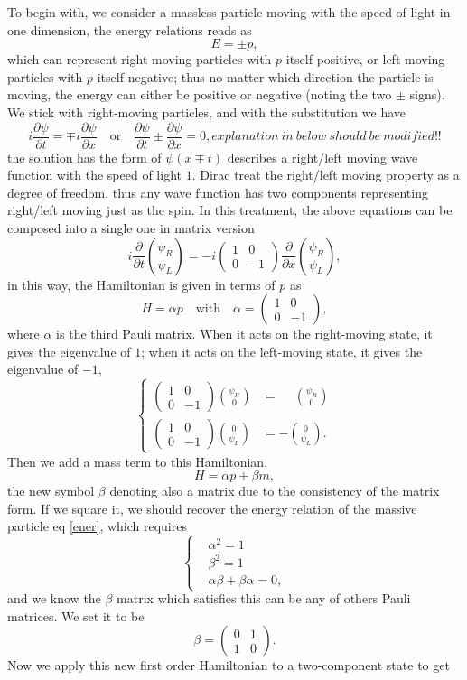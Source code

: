 \documentclass{article}
\newcommand{\be}{\begin{equation}}
\newcommand{\ee}{\end{equation}}
\newcommand{\ba}{\begin{array}}
\newcommand{\ea}{\end{array}}
\newcommand{\p}{\partial}
\renewcommand{\1}{\left}
\renewcommand{\2}{\right}
\newcommand{\al}{\alpha}
\newcommand{\bet}{\beta}
\begin{document}
To begin with, we consider a massless particle moving with the speed of light in one dimension, the energy relations reads as
\be
E=\pm p,
\ee
which can represent right moving particles with $p$ itself positive, or left moving particles with $p$ itself negative; thus no matter which direction the particle is moving, the energy can either be positive or negative (noting the two $\pm$ signs). We stick with right-moving particles, and with the substitution we have
\be
i\frac{\p\psi}{\p t}=\mp i\frac{\p\psi}{\p x} \quad\text{or}\quad \frac{\p\psi}{\p t}\pm\frac{\p\psi}{\p x}=0, explanation\ in\ below\ should\ be\ modified!!
\ee
the solution has the form of $\psi(x\mp t)$ describes a right/left moving wave function with the speed of light $1$. Dirac treat the right/left moving property as a degree of freedom, thus any wave function has two components representing right/left moving just as the spin. In this treatment, the above equations can be composed into a single one in matrix version
\be
i\frac{\p}{\p t}\binom{\psi_R}{\psi_L}=-i\1(\ba{cc}1&0\\0&-1\ea\2)\frac{\p}{\p x}\binom{\psi_R}{\psi_L},
\ee
in this way, the Hamiltonian is given in terms of $p$ as
\be
H=\al p \quad\text{with}\quad \al=\1(\ba{cc}1&0\\0&-1\ea\2),
\ee
where $\al$ is the third Pauli matrix. When it acts on the right-moving state, it gives the eigenvalue of $1$; when it acts on the left-moving state, it gives the eigenvalue of $-1$,
\be\1\{\begin{split}
\1(\ba{cc}1&0\\0&-1\ea\2)\binom{\psi_R}{0}&=\phantom{-}\binom{\psi_R}{0}\\
\1(\ba{cc}1&0\\0&-1\ea\2)\binom{0}{\psi_L}&=-\binom{0}{\psi_L}.
\end{split}\2.\ee
Then we add a mass term to this Hamiltonian,
\be
H=\al p+\bet m,
\ee
the new symbol $\bet$ denoting also a matrix due to the consistency of the matrix form. If we square it, we should recover the energy relation of the massive particle eq \eqref{ener}, which requires
\be\1\{\begin{split}
&\al^2=1\\
&\bet^2=1\\
&\al\bet+\bet\al=0,
\end{split}\2.\ee
and we know the $\bet$ matrix which satisfies this can be any of others Pauli matrices. We set it to be 
\be 
\bet=\1(\ba{cc}0&1\\1&0\ea\2).
\ee
Now we apply this new first order Hamiltonian to a two-component state to get
\end{document}
